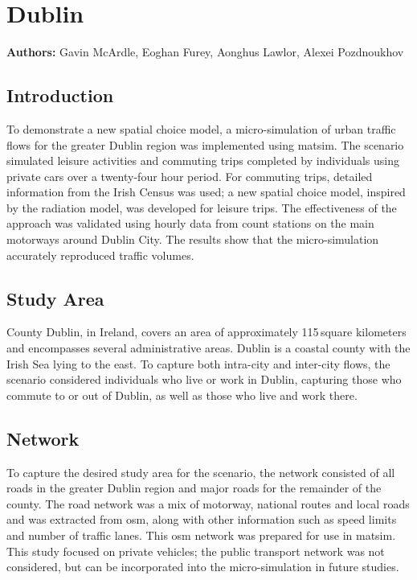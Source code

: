 \chapter{Dublin}
\label{ch:dublin}
\hfill \textbf{Authors:} Gavin McArdle, Eoghan Furey, Aonghus Lawlor, Alexei Pozdnoukhov


\section{Introduction}
To demonstrate a new spatial choice model, a micro-simulation of urban traffic flows for the greater Dublin region was implemented using \gls{matsim}. The scenario simulated leisure activities and commuting trips completed by individuals using private cars over a twenty-four hour period. For commuting trips, detailed information from the Irish Census was used; a new spatial choice model, inspired by the radiation model, was developed for leisure trips. The effectiveness of the approach was validated using hourly data from count stations on the main motorways around Dublin City. The results show that the micro-simulation accurately reproduced traffic volumes.

\section{Study Area}
County Dublin, in Ireland, covers an area of approximately 115\,square kilometers and encompasses several administrative areas. Dublin is a coastal county with the Irish Sea lying to the east. To capture both intra-city and inter-city flows, the scenario considered individuals who live or work in Dublin, capturing those who commute to or out of Dublin, as well as those who live and work there.

\section{Network}
To capture the desired study area for the scenario, the network consisted of all roads in the greater Dublin region and major roads for the remainder of the county. The road network was a mix of motorway, national routes and local roads and was extracted from \gls{osm}, along with other information such as speed limits and number of traffic lanes. This \gls{osm} network was prepared for use in \gls{matsim}.  This study focused on private vehicles; the public transport network was not considered, but can be incorporated into the micro-simulation in future studies.

